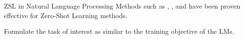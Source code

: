 \documentclass[
    11pt,
    notheorems,
    xcolor={dvipsnames},
    hyperref={
        pdfstartview=FitH, 
        pdftitle={Ikasketa-adibide urriko Informazio-Erauzketa}, 
        pdfauthor={Oscar Sainz Jimenez}, 
        citecolor=secondary, 
    }
]{beamer}
\begin{document}
\begin{frame}

    \begin{block}{ZSL in Natural Language Processing}
        Methods such as , , and  have been proven effective for Zero-Shot Learning methods.
        \blockskip

         Formulate the task of interest as similar to the training objective of the LMs.
    \end{block}

\end{frame}





\end{document}
